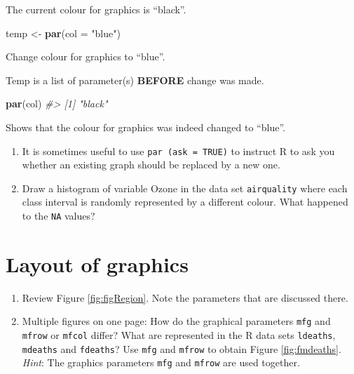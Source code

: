 \documentclass[
]{book}
\newenvironment{Shaded}{\begin{snugshade}}{\end{snugshade}}
\newcommand{\AttributeTok}[1]{\textcolor[rgb]{0.13,0.29,0.53}{#1}}
\newcommand{\CommentTok}[1]{\textcolor[rgb]{0.56,0.35,0.01}{\textit{#1}}}
\newcommand{\FunctionTok}[1]{\textcolor[rgb]{0.13,0.29,0.53}{\textbf{#1}}}
\newcommand{\NormalTok}[1]{#1}
\newcommand{\OtherTok}[1]{\textcolor[rgb]{0.56,0.35,0.01}{#1}}
\newcommand{\StringTok}[1]{\textcolor[rgb]{0.31,0.60,0.02}{#1}}
\begin{document}
The current colour for graphics is ``black''.

\begin{Shaded}
\begin{Highlighting}[]
\NormalTok{temp }\OtherTok{\textless{}{-}} \FunctionTok{par}\NormalTok{(}\AttributeTok{col =} \StringTok{"blue"}\NormalTok{)}
\end{Highlighting}
\end{Shaded}

Change colour for graphics to ``blue''.

\begin{Shaded}
\end{Shaded}

Temp is a list of parameter(s) \textbf{BEFORE} change was made.

\begin{Shaded}
\begin{Highlighting}[]
\FunctionTok{par}\NormalTok{(}\StringTok{\textquotesingle{}col\textquotesingle{}}\NormalTok{)}
\CommentTok{\#\textgreater{} [1] "black"}
\end{Highlighting}
\end{Shaded}

Shows that the colour for graphics was indeed changed to ``blue''.

\begin{enumerate}
\def\labelenumi{(\alph{enumi})}
\setcounter{enumi}{4}
\item
  It is sometimes useful to use \texttt{par\ (ask\ =\ TRUE)} to instruct R to ask you whether an existing graph should be replaced by a new one.
\item
  Draw a histogram of variable Ozone in the data set \texttt{airquality} where each class interval is randomly represented by a different colour. What happened to the \texttt{NA} values?
\end{enumerate}

\section{Layout of graphics}\label{layout-of-graphics}

\begin{enumerate}
\def\labelenumi{(\alph{enumi})}
\item
  Review Figure \ref{fig:figRegion}. Note the parameters that are discussed there.
\item
  Multiple figures on one page: How do the graphical parameters \texttt{mfg} and \texttt{mfrow} or \texttt{mfcol} differ? What are represented in the R data sets \texttt{ldeaths}, \texttt{mdeaths} and \texttt{fdeaths}? Use \texttt{mfg} and \texttt{mfrow} to obtain Figure \ref{fig:fmdeaths}. \emph{Hint}: The graphics parameters \texttt{mfg} and \texttt{mfrow} are used together.
\end{enumerate}
\end{document}
